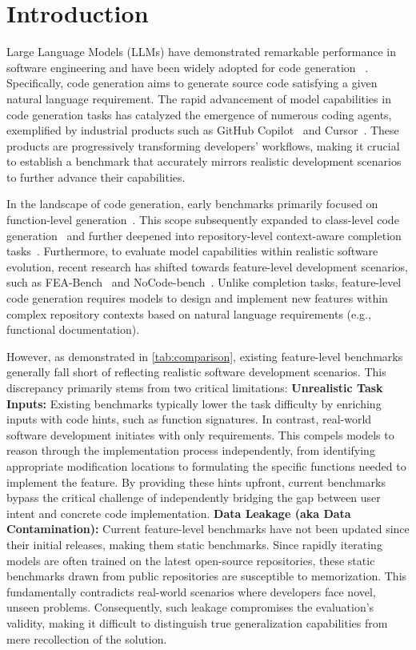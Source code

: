 \section{Introduction}
\label{sec:intro}
Large Language Models (LLMs) have demonstrated remarkable performance in software engineering and have been widely adopted for code generation ~\cite{aiXcoder-7B, cai2025ai, seedcoder}. Specifically, code generation aims to generate source code satisfying a given natural language requirement. The rapid advancement of model capabilities in code generation tasks has catalyzed the emergence of numerous coding agents, exemplified by industrial products such as GitHub Copilot~\cite{githubGitHubCopilot} and Cursor~\cite{cursorCursor}. These products are progressively transforming developers' workflows, making it crucial to establish a benchmark that accurately mirrors realistic development scenarios to further advance their capabilities.

In the landscape of code generation, early benchmarks primarily focused on function-level generation~\cite{humaneval}. This scope subsequently expanded to class-level code generation~\cite{classeval} and further deepened into repository-level context-aware completion tasks~\cite{li2024evocodebench}. Furthermore, to evaluate model capabilities within realistic software evolution, recent research has shifted towards feature-level development scenarios, such as FEA-Bench~\cite{li2025fea} and NoCode-bench~\cite{deng2025nocode}. Unlike completion tasks, feature-level code generation requires models to design and implement new features within complex repository contexts based on natural language requirements (e.g., functional documentation).

However, as demonstrated in \cref{tab:comparison}, existing feature-level benchmarks generally fall short of reflecting realistic software development scenarios. This discrepancy primarily stems from two critical limitations: 
 \textbf{Unrealistic Task Inputs:} Existing benchmarks typically lower the task difficulty by enriching inputs with code hints, such as function signatures. In contrast, real-world software development initiates with only requirements. This compels models to reason through the implementation process independently, from identifying appropriate modification locations to formulating the specific functions needed to implement the feature. By providing these hints upfront, current benchmarks bypass the critical challenge of independently bridging the gap between user intent and concrete code implementation.
 \textbf{Data Leakage (aka Data Contamination):} Current feature-level benchmarks have not been updated since their initial releases, making them static benchmarks. Since rapidly iterating models are often trained on the latest open-source repositories, these static benchmarks drawn from public repositories are susceptible to memorization. This fundamentally contradicts real-world scenarios where developers face novel, unseen problems. Consequently, such leakage compromises the evaluation's validity, making it difficult to distinguish true generalization capabilities from mere recollection of the solution.

